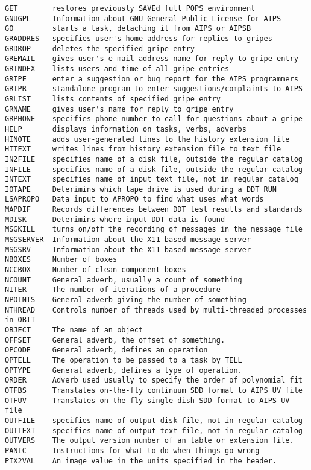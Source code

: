 \begin{verbatim}
GET        restores previously SAVEd full POPS environment
GNUGPL     Information about GNU General Public License for AIPS
GO         starts a task, detaching it from AIPS or AIPSB
GRADDRES   specifies user's home address for replies to gripes
GRDROP     deletes the specified gripe entry
GREMAIL    gives user's e-mail address name for reply to gripe entry
GRINDEX    lists users and time of all gripe entries
GRIPE      enter a suggestion or bug report for the AIPS programmers
GRIPR      standalone program to enter suggestions/complaints to AIPS
GRLIST     lists contents of specified gripe entry
GRNAME     gives user's name for reply to gripe entry
GRPHONE    specifies phone number to call for questions about a gripe
HELP       displays information on tasks, verbs, adverbs
HINOTE     adds user-generated lines to the history extension file
HITEXT     writes lines from history extension file to text file
IN2FILE    specifies name of a disk file, outside the regular catalog
INFILE     specifies name of a disk file, outside the regular catalog
INTEXT     specifies name of input text file, not in regular catalog
IOTAPE     Deterimins which tape drive is used during a DDT RUN
LSAPROPO   Data input to APROPO to find what uses what words
MAPDIF     Records differences between DDT test results and standards
MDISK      Deterimins where input DDT data is found
MSGKILL    turns on/off the recording of messages in the message file
MSGSERVER  Information about the X11-based message server
MSGSRV     Information about the X11-based message server
NBOXES     Number of boxes
NCCBOX     Number of clean component boxes
NCOUNT     General adverb, usually a count of something
NITER      The number of iterations of a procedure
NPOINTS    General adverb giving the number of something
NTHREAD    Controls number of threads used by multi-threaded processes in OBIT
OBJECT     The name of an object
OFFSET     General adverb, the offset of something.
OPCODE     General adverb, defines an operation
OPTELL     The operation to be passed to a task by TELL
OPTYPE     General adverb, defines a type of operation.
ORDER      Adverb used usually to specify the order of polynomial fit
OTFBS      Translates on-the-fly continuum SDD format to AIPS UV file
OTFUV      Translates on-the-fly single-dish SDD format to AIPS UV file
OUTFILE    specifies name of output disk file, not in regular catalog
OUTTEXT    specifies name of output text file, not in regular catalog
OUTVERS    The output version number of an table or extension file.
PANIC      Instructions for what to do when things go wrong
PIX2VAL    An image value in the units specified in the header.

\end{verbatim}
